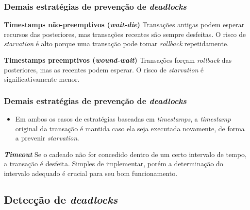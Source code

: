 \documentclass{beamer}
\begin{document}
\begin{frame} %
    \frametitle{Demais estratégias de prevenção de \emph{deadlocks}}
    
    \begin{block}{\textbf{Timestamps não-preemptivos (\emph{wait-die})}}
        Transações antigas podem esperar recursos das posteriores, mas transações recentes são sempre desfeitas. O risco de \emph{starvation} é alto porque uma transação pode tomar \emph{rollback} repetidamente.
    \end{block}

    \medskip
    \begin{block}{\textbf{Timestamps preemptivos (\emph{wound-wait})}}
        Transações forçam \emph{rollback} das posteriores, mas as recentes podem esperar. O risco de \emph{starvation} é significativamente menor.
    \end{block}

\end{frame}


\begin{frame} %
    \frametitle{Demais estratégias de prevenção de \emph{deadlocks}}

    \begin{itemize}
        \item Em ambos os casos de estratégias baseadas em \emph{timestamps}, a \emph{timestamp} original da transação é mantida caso ela seja executada novamente, de forma a prevenir \emph{starvation}.
    \end{itemize}

    \medskip
    \begin{block}{\textbf{\emph{Timeout}}}
        Se o cadeado não for concedido dentro de um certo intervalo de tempo, a transação é desfeita. Simples de implementar, porém a determinação do intervalo adequado é crucial para seu bom funcionamento.
    \end{block}
    
\end{frame}



\subsection{Detecção de \emph{deadlocks}}
\end{document}
